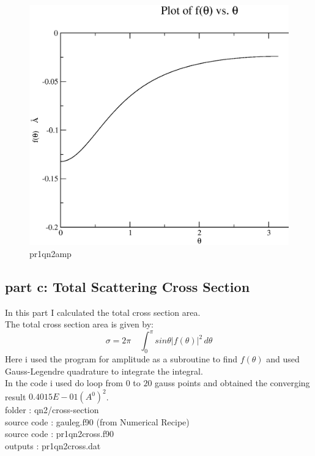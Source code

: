 \documentclass[11pt,a4paper,english]{article}
\newcommand{\bdm}{\begin{displaymath}}
\newcommand{\edm}{\end{displaymath}}
\begin{document}
	
	\begin{figure}[h!]
	\centering
	\includegraphics [scale=0.6]{pr1qn2amp.eps}
	\caption{pr1qn2amp }
	\end{figure}
	\clearpage


	
	\subsection{part c: Total Scattering Cross Section}
In this part I calculated the total cross section area.\\
The total cross section area is given by:\\
\bdm
\sigma=2\pi \quad \int_0^\pi \!\!  sin\theta |f(\theta)|^{2}\, d\theta
\edm 
Here i used the program for amplitude as a subroutine to find $f(\theta)$ and used Gauss-Legendre quadrature
to integrate the integral.\\
In the code i used do loop from $0$ to $20$ gauss points and 
obtained the converging result $0.4015E-01 (A^{0})^{2}$.\\
    folder       : qn2/cross-section\\
    source code  : gauleg.f90 (from Numerical Recipe) \\
	source code  : pr1qn2cross.f90\\
	outputs      : pr1qn2cross.dat\\ 
\end{document}
